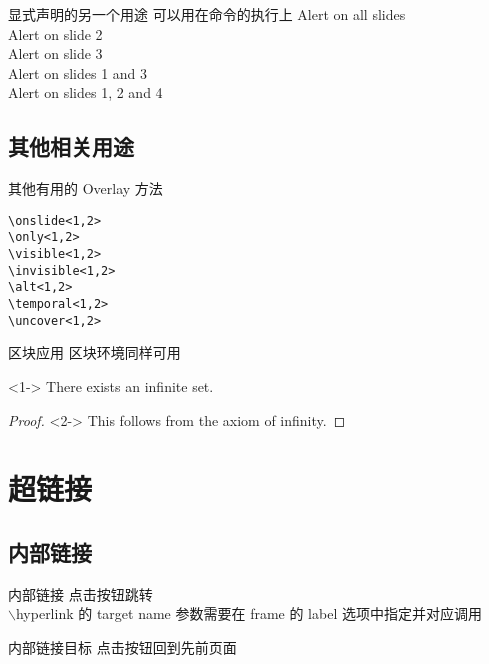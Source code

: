 \documentclass[UTF8,14pt,aspectratio=43,dvipsnames,svgnames,x11names,hyperref={urlcolor=blue}]{beamer}
\begin{document}
\begin{frame}{显式声明的另一个用途}
	可以用在命令的执行上  %
	\vskip12pt
	\alert{Alert on all slides}\\
	\alert<2>{Alert on slide 2}\\
	\alert<3>{Alert on slide 3}\\
	\alert<1,3>{Alert on slides 1 and 3}\\
	\alert<-2,4>{Alert on slides 1, 2 and 4}
\end{frame}

\subsection[其他相关用途]{其他相关用途}
\begin{frame}[fragile]{其他有用的 Overlay 方法}
	\begin{verbatim}
\onslide<1,2>
\only<1,2> 
\visible<1,2>
\invisible<1,2>
\alt<1,2> 
\temporal<1,2>
\uncover<1,2> 
\end{verbatim}
\end{frame}

\begin{frame}{区块应用}
	区块环境同样可用
	\begin{theorem}<1->
		There exists an infinite set.
	\end{theorem}
	\begin{proof}<2->
		This follows from the axiom of infinity.
	\end{proof}
\end{frame}

\section[超链接]{超链接}
\subsection[内部链接]{内部链接}
\begin{frame}[label=内部链接]{内部链接}
	点击按钮跳转 \hyperlink{内部链接目标}{}\\
	$\backslash$hyperlink 的 target name 参数需要在 frame 的 label 选项中指定并对应调用
\end{frame}

\begin{frame}[label=内部链接目标]{内部链接目标}
	点击按钮回到先前页面 \hyperlink{内部链接}{}
\end{frame}
\end{document}
